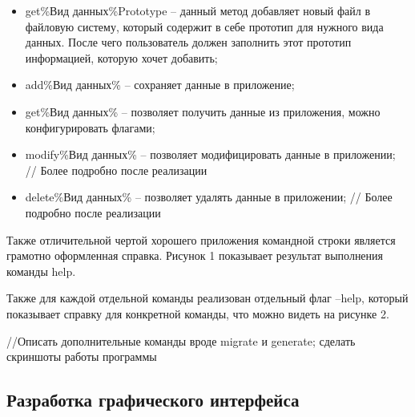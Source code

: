 \begin{itemize}
    \item get\%Вид данных\%Prototype -- данный метод добавляет новый файл в файловую систему,
        который содержит в себе прототип для нужного вида данных. После чего пользователь
        должен заполнить этот прототип информацией, которую хочет добавить;
    \item add\%Вид данных\% -- сохраняет данные в приложение;
    \item get\%Вид данных\% -- позволяет получить данные из приложения, можно конфигурировать
        флагами;
    \item modify\%Вид данных\% -- позволяет модифицировать данные в приложении; // Более подробно после реализации
    \item delete\%Вид данных\% -- позволяет удалять данные в приложении; // Более подробно после реализации
\end{itemize}

Также отличительной чертой хорошего приложения командной строки является грамотно оформленная справка.
Рисунок 1 показывает результат выполнения команды help. 


Также для каждой отдельной команды реализован
отдельный флаг --help, который показывает справку для конкретной команды, что можно видеть на рисунке 2. 



//Описать дополнительные команды вроде migrate и generate; сделать скриншоты работы программы

\subsection*{Разработка графического интерфейса}


